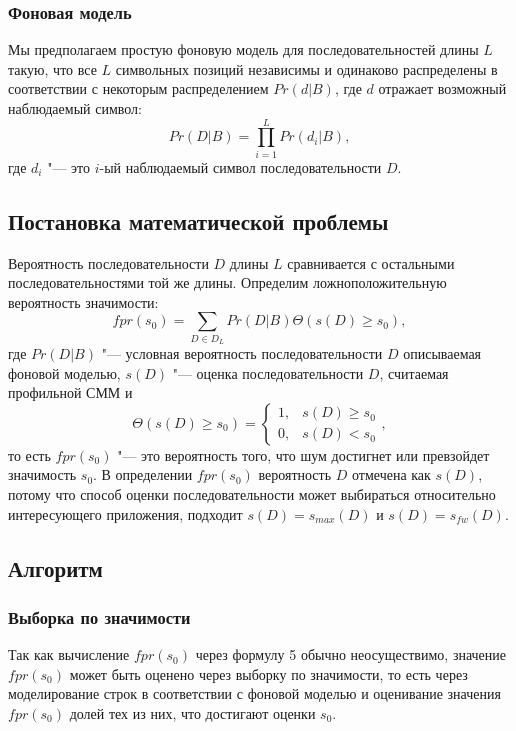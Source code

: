 \documentclass[]{article}
\begin{document}
			\subsubsection{Фоновая модель}
			Мы предполагаем простую фоновую модель для последовательностей длины $L$ такую, что все $L$ символьных позиций независимы и одинаково распределены в соответствии с некоторым распределением $Pr(d|B)$, где $d$ отражает возможный наблюдаемый символ:
			\begin{equation}
				Pr(D|B) = \prod_{i=1}^{L}Pr(d_{i}|B),
			\end{equation}
			где $d_{i}$ "--- это $i$-ый наблюдаемый символ последовательности $D$.
			
			\subsection{Постановка математической проблемы}
			Вероятность последовательности $D$ длины $L$ сравнивается с остальными последовательностями той же длины. Определим ложноположительную вероятность значимости:
			\begin{equation}
				fpr(s_{0}) =  \sum_{D \in D_{L}} Pr(D|B) \Theta(s(D) \geq s_{0}),
			\end{equation}
			где $Pr(D|B)$ "--- условная вероятность последовательности $D$ описываемая фоновой моделью, $s(D)$ "--- оценка последовательности $D$, считаемая профильной СММ и
			\[
				 \Theta(s(D) \geq s_{0}) = 
				 \begin{cases}
				 	1, & s(D) \geq s_{0}\\
				 	0, & s(D) < s_{0}
				 \end{cases},
			\]
			то есть $fpr(s_{0})$ "--- это вероятность того, что шум достигнет или превзойдет значимость $s_{0}$. В определении $fpr(s_{0})$ вероятность $D$ отмечена как $s(D)$, потому что способ оценки последовательности может выбираться относительно интересующего приложения, подходит $s(D) = s_{max}(D)$ и $s(D) = s_{fw}(D)$.
			
			\subsection{Алгоритм}
			\subsubsection{Выборка по значимости}
			Так как вычисление $fpr(s_{0})$ через формулу 5 обычно неосуществимо, значение $fpr(s_{0})$ может быть оценено через выборку по значимости, то есть через моделирование строк в соответствии с фоновой моделью и оценивание значения $fpr(s_{0})$ долей тех из них, что достигают оценки $s_{0}$.
			
\end{document}
